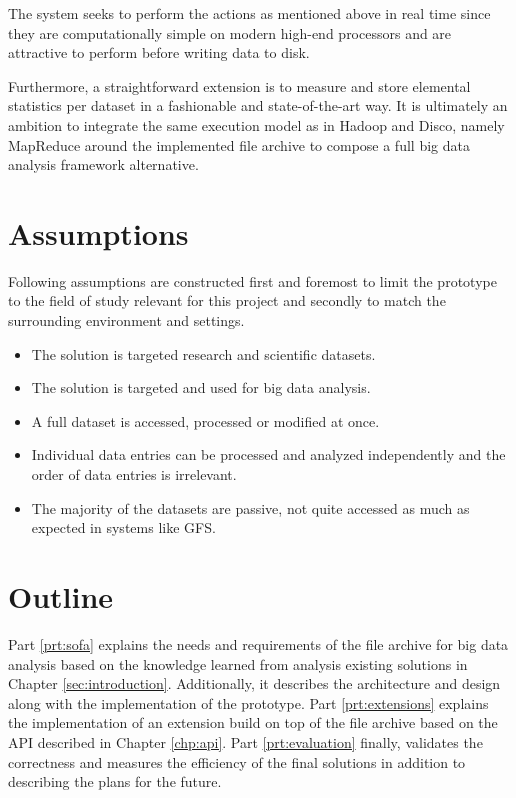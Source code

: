 The system seeks to perform the actions as mentioned above in real time since they are computationally simple on modern high-end processors and are attractive to perform before writing data to disk. 
\newline

Furthermore, a straightforward extension is to measure and store elemental statistics per dataset in a fashionable and state-of-the-art way. It is ultimately an ambition to integrate the same execution model as in \eg Hadoop and Disco, namely MapReduce around the implemented file archive to compose a full big data analysis framework alternative.

\section{Assumptions} \label{sec:assumption}
Following assumptions are constructed first and foremost to limit the prototype to the field of study relevant for this project and secondly to match the surrounding environment and settings.

\begin{itemize}
	\item The solution is targeted research and scientific datasets. 
	\item The solution is targeted and used for big data analysis.
	\item A full dataset is accessed, processed or modified at once.
	\item Individual data entries can be processed and analyzed independently and the order of data entries is irrelevant.
	\item The majority of the datasets are passive, \eg not quite accessed as much as expected in systems like GFS.
\end{itemize}

\section{Outline}
Part \ref{prt:sofa} explains the needs and requirements of the file archive for big data analysis based on the knowledge learned from analysis existing solutions in Chapter \ref{sec:introduction}. Additionally, it describes the architecture and design along with the implementation of the prototype. Part \ref{prt:extensions} explains the implementation of an extension build on top of the file archive based on the API described in Chapter \ref{chp:api}. Part \ref{prt:evaluation} finally, validates the correctness and measures the efficiency of the final solutions in addition to describing the plans for the future.